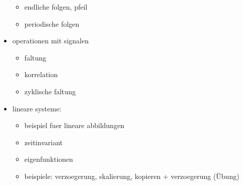 \begin{itemize}
\begin{itemize}
        \item endliche folgen, pfeil
        \item periodische folgen
    \end{itemize} 
    \item operationen mit signalen
    \begin{itemize}
        \item faltung
        \item korrelation
        \item zyklische faltung
    \end{itemize}
    \item lineare systeme: 
        \begin{itemize}
            \item beispiel fuer lineare abbildungen
            \item zeitinvariant
            \item eigenfunktionen
            \item beispiele: verzoegerung, skalierung, kopieren + verzoegerung (\"Ubung)
        \end{itemize}
\end{itemize}